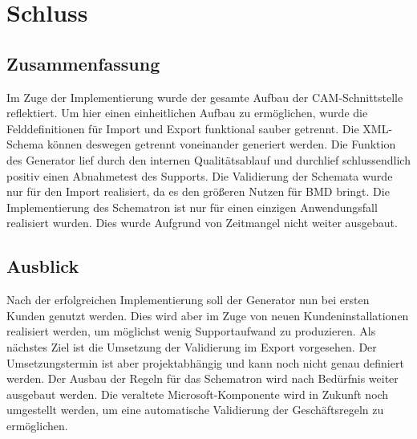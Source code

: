\chapter{Schluss}
\label{cha:Schluss}

\section{Zusammenfassung}
Im Zuge der Implementierung wurde der gesamte Aufbau der CAM-\-Schnitt\-stelle reflektiert. 
Um hier einen einheitlichen Aufbau zu ermöglichen, wurde die Felddefinitionen für Import und Export funktional sauber getrennt. 
Die XML-Schema können deswegen getrennt voneinander generiert werden.
Die Funktion des Generator lief durch den internen Qualitätsablauf und durchlief schlussendlich positiv einen Abnahmetest des Supports.
Die Validierung der Schemata wurde nur für den Import realisiert, da es den größeren Nutzen für BMD bringt. 
Die Implementierung des Schematron ist nur für einen einzigen Anwendungsfall realisiert wurden. Dies wurde Aufgrund von Zeitmangel nicht weiter ausgebaut. 



\section{Ausblick}
Nach der erfolgreichen Implementierung soll der Generator nun bei ersten Kunden genutzt werden. Dies wird aber im Zuge von neuen Kundeninstallationen realisiert werden, um möglichst wenig Supportaufwand zu produzieren.
Als nächstes Ziel ist die Umsetzung der Validierung im Export vorgesehen. Der Umsetzungstermin ist aber projektabhängig und kann noch nicht genau definiert werden.
Der Ausbau der Regeln für das Schematron wird nach Bedürfnis weiter ausgebaut werden. Die veraltete Microsoft-Komponente wird in Zukunft noch umgestellt werden, um eine automatische Validierung der Geschäftsregeln zu ermöglichen.


